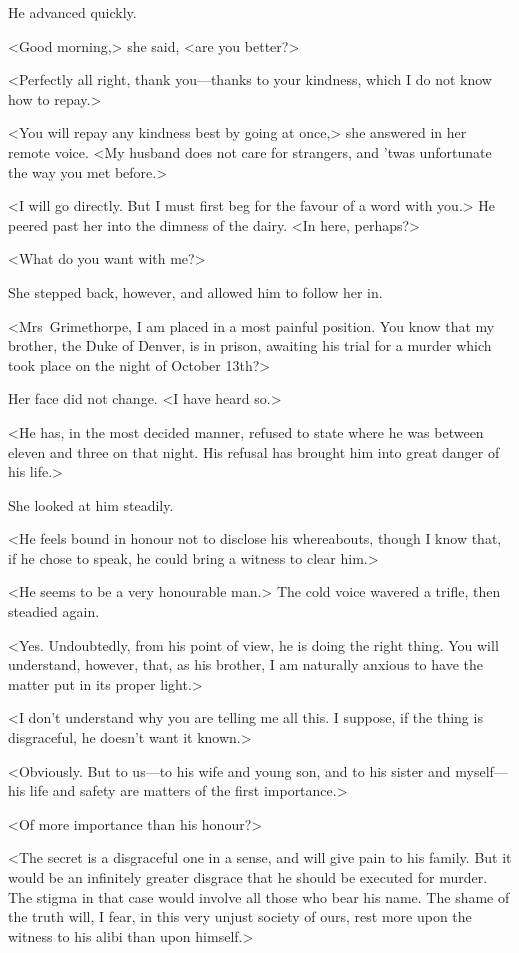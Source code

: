 He advanced quickly.

<Good morning,> she said, <are you better?>

<Perfectly all right, thank you—thanks to your kindness, which I do not know how to repay.>

<You will repay any kindness best by going at once,> she answered in her remote voice. <My husband does not care for strangers, and 'twas unfortunate the way you met before.>

<I will go directly. But I must first beg for the favour of a word with you.> He peered past her into the dimness of the dairy. <In here, perhaps?>

<What do you want with me?>

She stepped back, however, and allowed him to follow her in.

<Mrs~Grimethorpe, I am placed in a most painful position. You know that my brother, the Duke of Denver, is in prison, awaiting his trial for a murder which took place on the night of October 13th?>

Her face did not change. <I have heard so.>

<He has, in the most decided manner, refused to state where he was between eleven and three on that night. His refusal has brought him into great danger of his life.>

She looked at him steadily.

<He feels bound in honour not to disclose his whereabouts, though I know that, if he chose to speak, he could bring a witness to clear him.>

<He seems to be a very honourable man.> The cold voice wavered a trifle, then steadied again.

<Yes. Undoubtedly, from his point of view, he is doing the right thing. You will understand, however, that, as his brother, I am naturally anxious to have the matter put in its proper light.>

<I don't understand why you are telling me all this. I suppose, if the thing is disgraceful, he doesn't want it known.>

<Obviously. But to us—to his wife and young son, and to his sister and myself—his life and safety are matters of the first importance.>

<Of more importance than his honour?>

<The secret is a disgraceful one in a sense, and will give pain to his family. But it would be an infinitely greater disgrace that he should be executed for murder. The stigma in that case would involve all those who bear his name. The shame of the truth will, I fear, in this very unjust society of ours, rest more upon the witness to his alibi than upon himself.>

